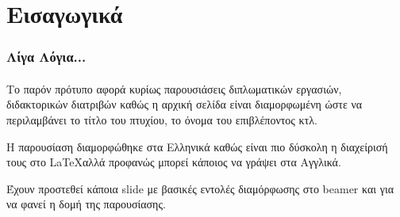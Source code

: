 \section{Εισαγωγικά}
 

\begin{frame}\frametitle{Λίγα Λόγια...}\framesubtitle{}
Το παρόν πρότυπο αφορά κυρίως παρουσιάσεις διπλωματικών εργασιών, διδακτορικών διατριβών καθώς η αρχική σελίδα είναι διαμορφωμένη ώστε να περιλαμβάνει το τίτλο του πτυχίου, το όνομα του επιβλέποντος κτλ.

Η παρουσίαση διαμορφώθηκε στα Ελληνικά καθώς είναι πιο δύσκολη η διαχείρισή τους στο \LaTeX  αλλά προφανώς μπορεί κάποιος να γράψει στα Αγγλικά. 

Έχουν προστεθεί κάποια slide με βασικές εντολές διαμόρφωσης στο beamer και για να φανεί η δομή της παρουσίασης.

\end{frame}
\note{}
